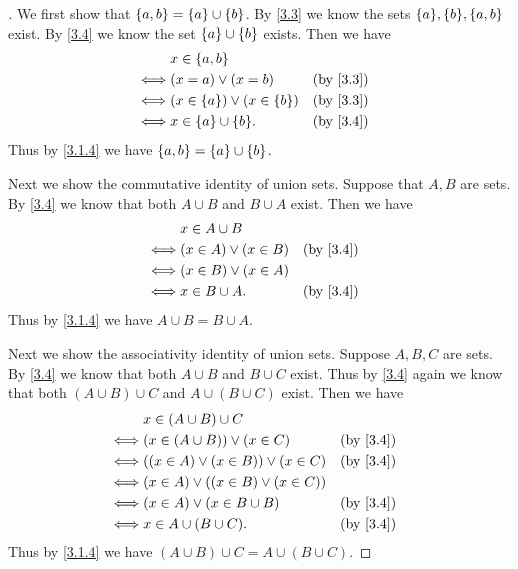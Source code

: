 \begin{proof}[]
  We first show that \(\left\lbrace a, b\right\rbrace = \left\lbrace a\right\rbrace \cup \left\lbrace b\right\rbrace\).
  By \cref{3.3} we know the sets \(\set{a}, \set{b}, \set{a, b}\) exist.
  By \cref{3.4} we know the set \(\left\lbrace a\right\rbrace \cup \left\lbrace b\right\rbrace\) exists.
  Then we have
  \begin{align*}
         & x \in \set{a, b}                                   \\
    \iff & (x = a) \lor (x = b)                 &  & \by{3.3} \\
    \iff & (x \in \set{a}) \lor (x \in \set{b}) &  & \by{3.3} \\
    \iff & x \in \set{a} \cup \set{b}.          &  & \by{3.4}
  \end{align*}
  Thus by \cref{3.1.4} we have \(\left\lbrace a, b\right\rbrace = \left\lbrace a\right\rbrace \cup \left\lbrace b\right\rbrace\).

  Next we show the commutative identity of union sets.
  Suppose that \(A, B\) are sets.
  By \cref{3.4} we know that both \(A \cup B\) and \(B \cup A\) exist.
  Then we have
  \begin{align*}
         & x \in A \cup B                         \\
    \iff & (x \in A) \lor (x \in B) &  & \by{3.4} \\
    \iff & (x \in B) \lor (x \in A)               \\
    \iff & x \in B \cup A.          &  & \by{3.4}
  \end{align*}
  Thus by \cref{3.1.4} we have \(A \cup B = B \cup A\).

  Next we show the associativity identity of union sets.
  Suppose \(A, B, C\) are sets.
  By \cref{3.4} we know that both \(A \cup B\) and \(B \cup C\) exist.
  Thus by \cref{3.4} again we know that both \((A \cup B) \cup C\) and \(A \cup (B \cup C)\) exist.
  Then we have
  \begin{align*}
         & x \in (A \cup B) \cup C                                 \\
    \iff & (x \in (A \cup B)) \lor (x \in C)         &  & \by{3.4} \\
    \iff & ((x \in A) \lor (x \in B)) \lor (x \in C) &  & \by{3.4} \\
    \iff & (x \in A) \lor ((x \in B) \lor (x \in C))               \\
    \iff & (x \in A) \lor (x \in B \cup B)           &  & \by{3.4} \\
    \iff & x \in A \cup (B \cup C).                  &  & \by{3.4}
  \end{align*}
  Thus by \cref{3.1.4} we have \((A \cup B) \cup C = A \cup (B \cup C)\).


\end{proof}
